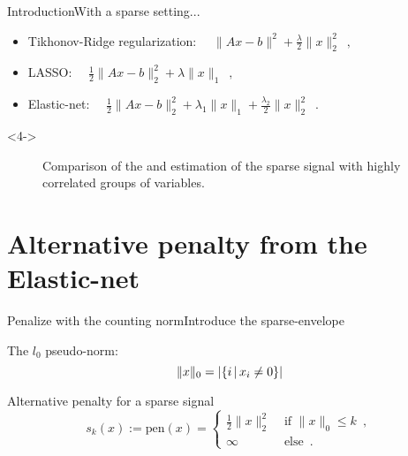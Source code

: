 \documentclass[10pt,aspectratio=43]{beamer}
\begin{document}
\begin{frame}{Introduction}{With a sparse setting...}

    \begin{itemize}
        \item<1-> Tikhonov-Ridge regularization:    $\quad\|Ax-b\|^2 + \frac{\lambda}{2}\|x\|_2^2\enspace,$
        \item<2-> LASSO:   
        $\quad\frac{1}{2}\|Ax-b\|^2_2 + \lambda \|x\|_1\enspace,$
        \item<3-> Elastic-net:   
        $\quad\frac{1}{2}\|Ax-b\|^2_2 + \lambda_1 \|x\|_1 +  \frac{\lambda_2}{2}\|x\|^2_2\enspace.$
        \end{itemize}
        \begin{onlyenv}<4->
\begin{figure}[ht]\centering
\caption{Comparison of the \lasso and \enet estimation of the sparse signal with highly correlated groups of variables.}
\vspace{-.1cm}



\end{figure}
        \end{onlyenv}
\end{frame}


\section[Alternative penalty]{Alternative penalty from the Elastic-net}

\begin{frame}{Penalize with the counting norm}{Introduce the sparse-envelope}

{ The $l_0$ pseudo-norm:
\begin{equation*}
\|x\|_0 = \left|\{i\,|\, x_i\neq 0\}\right|
\end{equation*}}
\medskip
\begin{block}{Alternative penalty for a sparse signal}
\[s_k(x):=\mathrm{pen}(x)=\begin{cases}
\frac{1}{2}\|x\|^2_2 & \text{ if }\|x\|_0\leq k\enspace, \\ \infty &\text{ else}\enspace.\end{cases}\]
\end{block}
\end{frame}
\end{document}
